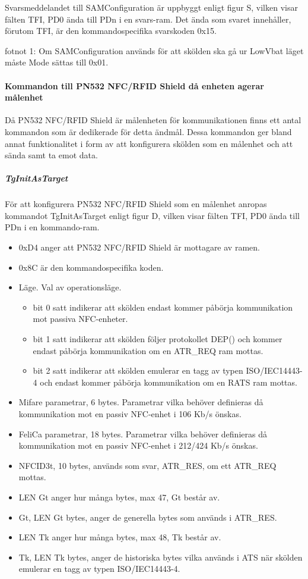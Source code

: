 \documentclass[11pt]{article}
\begin{document}
Svarsmeddelandet till SAMConfiguration är uppbyggt enligt figur S, vilken visar fälten TFI, PD0 ända till PDn i en svars-ram. Det ända som svaret innehåller, förutom TFI,  är den kommandospecifika svarskoden 0x15.


fotnot 1: Om SAMConfiguration används för att skölden ska gå ur LowVbat läget måste Mode sättas till 0x01.  

\paragraph{Kommandon till PN532 NFC/RFID Shield då enheten agerar målenhet}

Då PN532 NFC/RFID Shield är målenheten för kommunikationen finns ett antal kommandon som är dedikerade för detta ändmål. Dessa kommandon ger bland annat funktionalitet i form av att konfigurera skölden som en målenhet och att sända samt ta emot data.

\subparagraph{TgInitAsTarget}
För att konfigurera PN532 NFC/RFID Shield som en målenhet anropas kommandot TgInitAsTarget enligt figur D, vilken visar fälten TFI, PD0 ända till PDn i en kommando-ram. 


\begin{itemize}
\item 0xD4 anger att PN532 NFC/RFID Shield är mottagare av ramen.
\item 0x8C är den kommandospecifika koden.
\item Läge. Val av operationsläge. 
\begin{itemize}
\item bit 0 satt indikerar att skölden endast kommer påbörja kommunikation mot passiva NFC-enheter.
\item bit 1 satt indikerar att skölden följer protokollet DEP() och kommer endast påbörja kommunikation om en ATR\_REQ ram mottas.
\item bit 2 satt indikerar att skölden emulerar en tagg av typen ISO/IEC14443-4 och endast kommer påbörja kommunikation om en RATS ram mottas.
\end{itemize}
\item Mifare parametrar, 6 bytes. Parametrar vilka behöver definieras då kommunikation mot en passiv NFC-enhet i 106 Kb/s önskas.
\item FeliCa parametrar, 18 bytes. Parametrar vilka behöver definieras då kommunikation mot en passiv NFC-enhet i 212/424 Kb/s önskas.
\item NFCID3t, 10 bytes, används som svar, ATR\_RES, om ett ATR\_REQ mottas.
\item LEN Gt anger hur många bytes, max 47, Gt består av. 
\item Gt, LEN Gt bytes, anger de generella bytes som används i ATR\_RES.
\item LEN Tk anger hur många bytes, max 48, Tk består av.
\item Tk, LEN Tk bytes, anger de historiska bytes vilka används i ATS när skölden emulerar en tagg av typen ISO/IEC14443-4.
\end{itemize}
\end{document}
